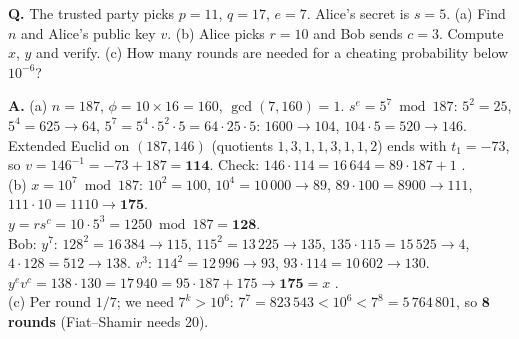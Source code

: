 \begin{worked}
\textbf{Q.} The trusted party picks $p = 11$, $q = 17$, $e = 7$. Alice's secret is $s = 5$. (a) Find $n$ and Alice's public key $v$. (b) Alice picks $r = 10$ and Bob sends $c = 3$. Compute $x$, $y$ and verify. (c) How many rounds are needed for a cheating probability below $10^{-6}$?

\textbf{A.} (a) $n = 187$, $\phi = 10 \times 16 = 160$, $\gcd(7, 160) = 1$. $s^e = 5^7 \bmod 187$: $5^2 = 25$, $5^4 = 625 \to 64$, $5^7 = 5^4 \cdot 5^2 \cdot 5 = 64 \cdot 25 \cdot 5$: $1600 \to 104$, $104 \cdot 5 = 520 \to 146$. Extended Euclid on $(187, 146)$ (quotients $1, 3, 1, 1, 3, 1, 1, 2$) ends with $t_1 = -73$, so $v = 146^{-1} = -73 + 187 = \mathbf{114}$. Check: $146 \cdot 114 = 16\,644 = 89 \cdot 187 + 1$ \checkmark.\\
(b) $x = 10^7 \bmod 187$: $10^2 = 100$, $10^4 = 10\,000 \to 89$, $89 \cdot 100 = 8900 \to 111$, $111 \cdot 10 = 1110 \to \mathbf{175}$.\\
$y = r s^c = 10 \cdot 5^3 = 1250 \bmod 187 = \mathbf{128}$.\\
Bob: $y^7$: $128^2 = 16\,384 \to 115$, $115^2 = 13\,225 \to 135$, $135 \cdot 115 = 15\,525 \to 4$, $4 \cdot 128 = 512 \to 138$. \;$v^3$: $114^2 = 12\,996 \to 93$, $93 \cdot 114 = 10\,602 \to 130$.\\
$y^e v^c = 138 \cdot 130 = 17\,940 = 95 \cdot 187 + 175 \to \mathbf{175} = x$ \checkmark.\\
(c) Per round $1/7$; we need $7^k > 10^6$: $7^7 = 823\,543 < 10^6 < 7^8 = 5\,764\,801$, so $\mathbf{8}$ \textbf{rounds} (Fiat--Shamir needs 20).
\end{worked}

